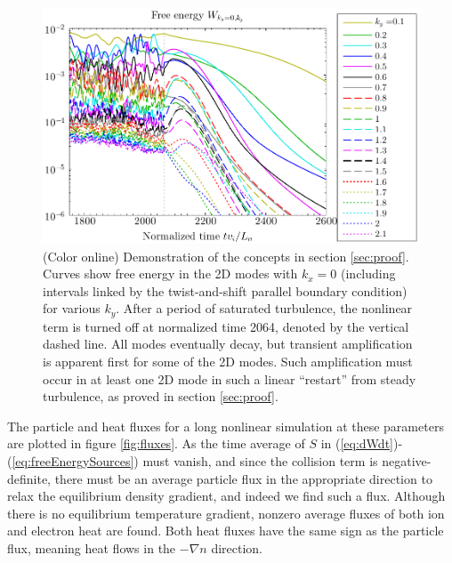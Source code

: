 \documentclass[12pt,superscriptaddress]{revtex4}
\begin{document}
\begin{figure}[h!]
\includegraphics[width=6.5in]{m20141126_02_plotWVsTimeForPaper_linearRestart.pdf}
\caption{(Color online)
Demonstration of the concepts in section \ref{sec:proof}.
Curves show free energy in the 2D modes with $k_x=0$ (including intervals linked by
the twist-and-shift parallel boundary condition) for various $k_y$.
After a period of saturated turbulence, the nonlinear term is turned off at normalized
time 2064, denoted by the vertical dashed line.
All modes eventually decay, but transient amplification is apparent first
for some of the 2D modes. Such amplification must occur in at least one 2D mode in such a linear ``restart'' from
steady turbulence, as proved in section \ref{sec:proof}.
\label{fig:linearRestart}}
\end{figure}

The particle and heat fluxes for a long nonlinear simulation at these parameters are plotted in figure \ref{fig:fluxes}.
As the time average of $S$ in (\ref{eq:dWdt})-(\ref{eq:freeEnergySources}) must vanish, and since the collision term
is negative-definite, there must be an average particle flux in the appropriate direction
to relax the equilibrium density gradient, and indeed we find such a flux.
Although there is no equilibrium temperature gradient, nonzero average fluxes
of both ion and electron heat are found.  Both heat fluxes have the same sign
as the particle flux, meaning heat flows in the $-\nabla n$ direction.
\end{document}
